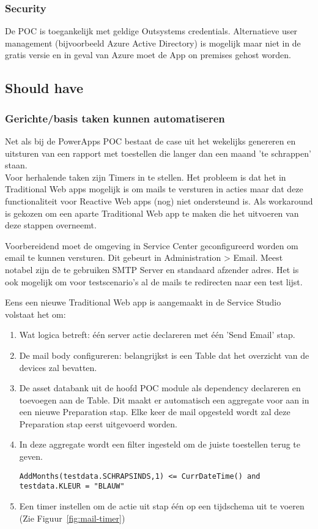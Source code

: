 \subsubsection{Security}

De POC is toegankelijk met geldige Outsystems credentials. Alternatieve user management (bijvoorbeeld Azure Active Directory) is mogelijk maar niet in de gratis versie en in geval van Azure moet de App on premises gehost worden.

\subsection{Should have}

\subsubsection{Gerichte/basis taken kunnen automatiseren}
\label{subsec:os-automatisatie}

Net als bij de PowerApps POC bestaat de case uit het wekelijks genereren en uitsturen van een rapport met toestellen die langer dan een maand 'te schrappen' staan.\\
Voor herhalende taken zijn Timers in te stellen. Het probleem is dat het in Traditional Web apps mogelijk is om mails te versturen in acties maar dat deze functionaliteit voor Reactive Web apps (nog) niet ondersteund is. Als workaround is gekozen om een aparte Traditional Web app te maken die het uitvoeren van deze stappen overneemt.

Voorbereidend moet de omgeving in Service Center geconfigureerd worden om email te kunnen versturen. Dit gebeurt in Administration > Email. Meest notabel zijn de te gebruiken SMTP Server en standaard afzender adres. Het is ook mogelijk om voor testscenario's al de mails te redirecten naar een test lijst.

Eens een nieuwe Traditional Web app is aangemaakt in de Service Studio volstaat het om:
\begin{enumerate}
    \item Wat logica betreft: één server actie declareren met één 'Send Email' stap.
    \item De mail body configureren: belangrijkst is een Table dat het overzicht van de devices zal bevatten.
    \item De asset databank uit de hoofd POC module als dependency declareren en toevoegen aan de Table. Dit maakt er automatisch een aggregate voor aan in een nieuwe Preparation stap. Elke keer de mail opgesteld wordt zal deze Preparation stap eerst uitgevoerd worden.
    \item In deze aggregate wordt een filter ingesteld om de juiste toestellen terug te geven.
\begin{lstlisting}
AddMonths(testdata.SCHRAPSINDS,1) <= CurrDateTime() and testdata.KLEUR = "BLAUW"
\end{lstlisting} 
    \item Een timer instellen om de actie uit stap één op een tijdschema uit te voeren (Zie Figuur~\ref{fig:mail-timer})
\end{enumerate}


